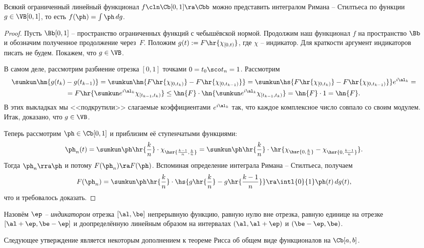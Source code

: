 \documentclass[a4paper]{article}
\begin{document}
\begin{theorem}[Ф. Рисса]
Всякий ограниченный линейный функционал $f\cln \Cb[0,1] \ra \Cbb$ можно представить интегралом Римана -- Стилтьеса
по функции $g \in \VB[0,1]$, то есть $f(\ph) = \int \ph\,dg$.
\end{theorem}
\begin{proof}
Пусть $\Bb[0,1]$ -- пространство ограниченных функций с чебышёвской нормой.
Продолжим наш функционал $f$ на пространство $\Bb$ и обозначим полученное продолжение
через~$F$. Положим $g(t) := F\hr{\chi_{[0,t)}}$, где $\chi$ -- индикатор. Для краткости
аргумент индикаторов писать не будем.
Покажем, что $g \in \VB$.

В самом деле, рассмотрим разбиение отрезка $[0,1]$ точками $0=t_0\sco t_n=1$. Рассмотрим
\begin{multline*}
\sumkun \hm{g(t_k)-g(t_{k-1})} = \sumkun \hm{F\hr{\chi_{[0,t_k)}} - F \hr{\chi_{[0,t_{k-1})}}}=
\sumkun \hs{F\hr{\chi_{[0,t_k)}} - F\hr{\chi_{[0,t_{k-1})}}}e^{i\al_k} =\\=
F\hr{\sumkun e^{i\al_k} \chi_{[t_{k-1},t_k)}} \le
\hn{F} \cdot \hn{\sumkun e^{i\al_k} \chi_{[t_{k-1},t_k)}} = \hn{F}\cdot 1 = \hn{F}.
\end{multline*}
В этих выкладках мы <<подкрутили>> слагаемые коэффициентами $e^{i\al_k}$ так, что каждое комплексное число
совпало со своим модулем. Итак, доказано, что $g \in \VB$.

Теперь рассмотрим $\ph \in \Cb[0,1]$ и приблизим её ступенчатыми функциями:
$$\ph_n(t) = \sumkun \ph\hr{\frac kn}\cdot \chi_{\hsr{\frac{k-1}{n}, \frac kn}} =
             \sumkun \ph\hr{\frac kn}\cdot \hr{\chi_{\hsr{0, \frac kn}} -\chi_{\hsr{0, \frac{k-1}{n}}}}.$$
Тогда $\ph_n \rra \ph$ и потому $F(\ph_n) \ra F(\ph)$.
Вспоминая определение интеграла Римана -- Стилтьеса, получаем
$$F(\ph_n) = \sumkun \ph\hr{\frac kn}\cdot \hs{g\hr{\frac kn} -g\hr{\frac{k-1}{n}}} \ra \intl{0}{1} \ph(t)\,d g(t),$$
что и требовалось доказать.
\end{proof}

\begin{df}
Назовём \emph{$\ep$ -- индикатором} отрезка $[\al, \be]$ непрерывную функцию, равную нулю вне отрезка,
равную единице на отрезке $[\al + \ep, \be - \ep]$ и доопределённую линейным образом на интервалах
$(\al, \al + \ep)$ и $(\be - \ep,\be)$.
\end{df}


Следующее утверждение является некоторым дополнением к теореме Рисса об общем виде
функционалов на $\Cb[a,b]$.
\end{document}
